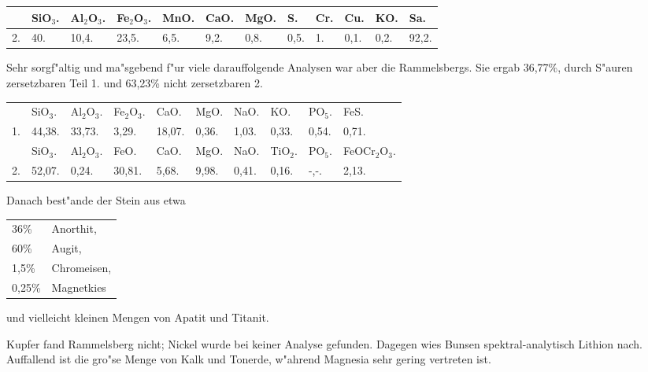\documentclass[a4paper, 11pt, oneside]{article}
\begin{document}
\begin{table}[!ht]
    \centering
    \footnotesize
    \begin{tabular}{p{3mm} p{6mm} p{6mm} p{6mm} p{6mm} p{6mm} p{6mm} p{6mm} p{6mm} p{6mm} p{6mm} p{6mm}}
         & SiO$_{3}$. & Al$_{2}$O$_{3}$. & Fe$_{2}$O$_{3}$. & MnO. & CaO. & MgO. & S. & Cr. & Cu. & KO. & Sa. \\ \hline
        2. & 40. & 10,4. & 23,5. & 6,5. & 9,2. & 0,8. & 0,5. & 1. & 0,1. & 0,2. & 92,2. \\
    \end{tabular}
\end{table}

Sehr sorgf"altig und ma"sgebend f"ur viele darauffolgende Analysen war aber die Rammelsbergs. Sie ergab 36,77\%, durch S"auren zersetzbaren Teil 1. und 63,23\% nicht zersetzbaren 2.
\begin{table}[!ht]
    \centering
    \footnotesize    
    \begin{tabular}{l l l l l l l l l l}
         & SiO$_{3}$. & Al$_{2}$O$_{3}$. & Fe$_{2}$O$_{3}$. & CaO. & MgO. & NaO. & KO. & PO$_{5}$. & FeS. \\
        1. & 44,38. & 33,73. & 3,29. & 18,07. & 0,36. & 1,03. & 0,33. & 0,54. & 0,71. \\ \hline
         & SiO$_{3}$. & Al$_{2}$O$_{3}$. & FeO. & CaO. & MgO. & NaO. & TiO$_{2}$. & PO$_{5}$. & FeOCr$_{2}$O$_{3}$. \\
        2. & 52,07. & 0,24. & 30,81. & 5,68. & 9,98. & 0,41. & 0,16. & -,-. & 2,13. \\
    \end{tabular}
\end{table}

Danach best"ande der Stein aus etwa
\begin{table}[!ht]
    \centering
    \begin{tabular}{l l}
        36\% & Anorthit, \\
        60\% & Augit, \\
        1,5\% & Chromeisen, \\
        0,25\% & Magnetkies \\
    \end{tabular}
\end{table}

und vielleicht kleinen Mengen von Apatit und Titanit.

Kupfer fand Rammelsberg nicht; Nickel wurde bei keiner Analyse gefunden. Dagegen wies Bunsen spektral-analytisch Lithion nach. Auffallend ist die gro"se Menge von Kalk und Tonerde, w"ahrend Magnesia sehr gering vertreten ist.
\end{document}
